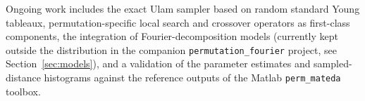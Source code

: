 \documentclass[a4paper,11pt]{article}
\begin{document}
Ongoing work includes the exact Ulam sampler based on random standard Young
tableaux, permutation-specific local search and crossover operators as
first-class components, the integration of Fourier-decomposition models
(currently kept outside the distribution in the companion
\texttt{permutation\_fourier} project, see Section~\ref{sec:models}), and a
validation of the parameter estimates and sampled-distance histograms against
the reference outputs of the Matlab \texttt{perm\_mateda} toolbox.



\end{document}
